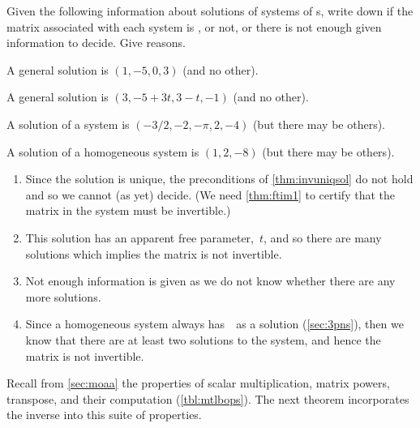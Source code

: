 \begin{example} 
Given the following information about solutions of systems of s, write down if the matrix associated with each system is , or not, or there is not enough given information to decide.  Give reasons.
\begin{Parts}
\item A general solution is \((1,-5,0,3)\) (and no other).
\item A general solution is \((3,-5+3t,3-t,-1)\) (and no other).
\item A solution of a system is \((-3/2,-2,-\pi,2,-4)\) (but there may be others).
\item A solution of a homogeneous system is \((1,2,-8)\) (but there may be others).
\end{Parts}
\begin{solution} 
\begin{enumerate}
\item Since the solution is unique, the preconditions of \cref{thm:invuniqsol} do not hold and so we cannot (as yet) decide. 
(We need \cref{thm:ftim1} to certify that the matrix in the system must be invertible.)
\item This solution has an apparent free parameter,~\(t\), and so there are many solutions which implies the matrix is not invertible.
\item Not enough information is given as we do not know whether there are any more solutions.
\item Since a homogeneous system always has~\ov\ as a solution (\cref{sec:3pns}), then we know that there are at least two solutions to the system, and hence the matrix is not invertible.
\end{enumerate}
\end{solution}
\end{example}




Recall from \cref{sec:moaa} the properties of scalar multiplication, matrix powers, transpose, and their computation (\cref{tbl:mtlbops}).
The next theorem incorporates the inverse into this suite of properties.


